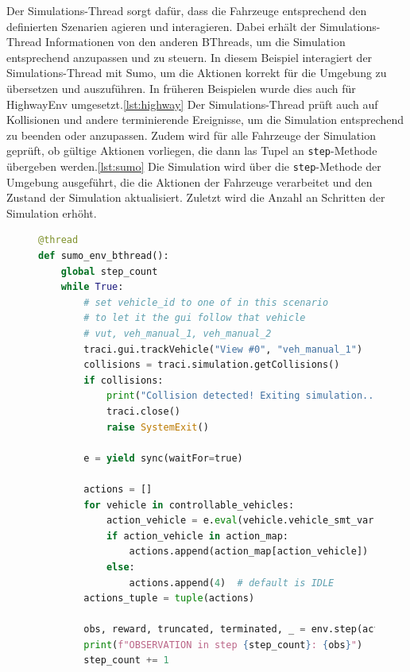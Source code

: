 Der Simulations-Thread sorgt dafür, dass die Fahrzeuge entsprechend den definierten Szenarien agieren und interagieren. Dabei erhält der Simulations-Thread Informationen von den anderen BThreads, um die Simulation entsprechend anzupassen und zu steuern.
In diesem Beispiel interagiert der Simulations-Thread mit Sumo, um die Aktionen korrekt für die Umgebung zu übersetzen und auszuführen. In früheren Beispielen wurde dies auch für HighwayEnv umgesetzt.\ref{lst:highway}
Der Simulations-Thread prüft auch auf Kollisionen und andere terminierende Ereignisse, um die Simulation entsprechend zu beenden oder anzupassen. Zudem wird für alle Fahrzeuge der Simulation geprüft, ob gültige Aktionen vorliegen, die dann las Tupel an \texttt{step}-Methode übergeben werden.\ref{lst:sumo}
Die Simulation wird über die \texttt{step}-Methode der Umgebung ausgeführt, die die Aktionen der Fahrzeuge verarbeitet und den Zustand der Simulation aktualisiert. Zuletzt wird die Anzahl an Schritten der Simulation erhöht.
\begin{figure}[ht]
\begin{lstlisting}[language=Python, caption=Simulations-Thread Beispiel SumoEnv, basicstyle=\ttfamily\small, label={lst:sumo}]
@thread
def sumo_env_bthread():
    global step_count
    while True:
        # set vehicle_id to one of in this scenario
        # to let it the gui follow that vehicle
        # vut, veh_manual_1, veh_manual_2
        traci.gui.trackVehicle("View #0", "veh_manual_1")
        collisions = traci.simulation.getCollisions()
        if collisions:
            print("Collision detected! Exiting simulation...")
            traci.close()
            raise SystemExit()

        e = yield sync(waitFor=true)

        actions = []
        for vehicle in controllable_vehicles:
            action_vehicle = e.eval(vehicle.vehicle_smt_var)
            if action_vehicle in action_map:
                actions.append(action_map[action_vehicle])
            else:
                actions.append(4)  # default is IDLE
        actions_tuple = tuple(actions)

        obs, reward, truncated, terminated, _ = env.step(actions_tuple)
        print(f"OBSERVATION in step {step_count}: {obs}")
        step_count += 1
\end{lstlisting}
\end{figure}

